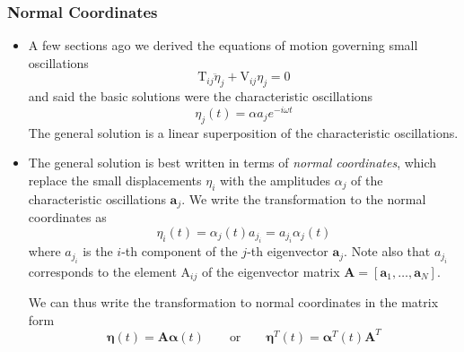 \documentclass[11pt, a4paper]{article}
\newcommand{\eqtext}[1]{\qquad \text{#1} \qquad}
\newcommand{\mat}[1]{\mathbf{#1}}
\begin{document}
\subsubsection{Normal Coordinates}
\begin{itemize}
	\item A few sections ago we derived the equations of motion governing small oscillations
	\begin{equation*}
		\mathrm{T}_{ij} \ddot{\eta}_{j} + \mathrm{V}_{ij} \eta_{j} = 0
	\end{equation*}
	and said the basic solutions were the characteristic oscillations
	\begin{equation*}
		\eta_{j}(t) = \alpha a_{j} e^{-i\omega t}
	\end{equation*}
	The general solution is a linear superposition of the characteristic oscillations. 
	
	\item The general solution is best written in terms of \textit{normal coordinates}, which replace the small displacements $ \eta_{i} $ with the amplitudes $ \alpha_{j} $ of the characteristic oscillations $ \bm{a}_{j} $. We write the transformation to the normal coordinates as
	\begin{equation*}
		\eta_{i}(t) = \alpha_{j}(t) a_{j_{i}} =  a_{j_{i}} \alpha_{j}(t)
	\end{equation*}
	where $ a_{j_{i}} $ is the $ i $-th component of the $ j $-th eigenvector $ \bm{a}_{j} $. Note also that $ a_{j_{i}} $ corresponds to the element $ \mathrm{A}_{ij} $ of the eigenvector matrix $ \mat{A} = [\bm{a}_{1}, \ldots, \bm{a}_{N}] $.
	
	We can thus write the transformation to normal coordinates in the matrix form
	\begin{equation*}
		\bm{\eta}(t) = \mat{A} \bm{\alpha}(t) \eqtext{or} \bm{\eta}^{T}(t) = \bm{\alpha}^{T}(t) \mat{A}^{T} 
	\end{equation*}
	

\end{itemize}
\end{document}
